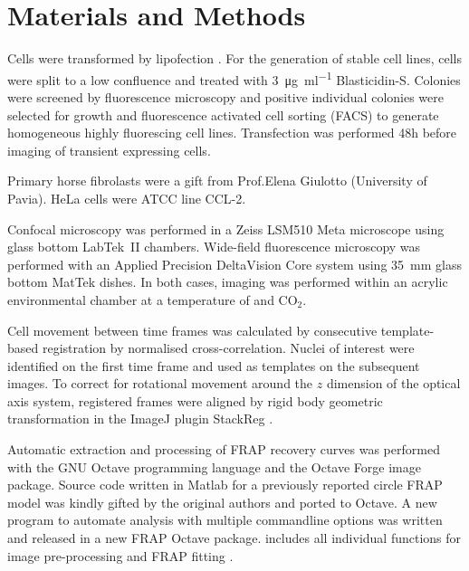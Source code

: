 \section{Materials and Methods}

  Cells were transformed by lipofection .
  For the generation of stable cell lines,
  cells were split to a low confluence and treated
  with \SI{3}{\ug\per\ml} Blasticidin-S.
  Colonies were screened by fluorescence microscopy
  and positive individual colonies were selected for growth
  and fluorescence activated cell sorting (FACS) to generate
  homogeneous highly fluorescing cell lines.
  Transfection was performed 48h before imaging of
  transient expressing cells.

  Primary horse fibrolasts were a gift from Prof.\@ Elena Giulotto
  (University of Pavia). HeLa cells were ATCC line CCL-2.

  Confocal microscopy was performed in a Zeiss LSM510 Meta microscope
  using glass bottom LabTek~II chambers.  Wide-field fluorescence
  microscopy was performed with an Applied Precision DeltaVision Core
  system using \SI{35}{\mm} glass bottom MatTek dishes.  In both
  cases, imaging was performed within an acrylic environmental chamber
  at a temperature of  and  CO$_2$.


  Cell movement between time frames was calculated by consecutive
  template-based registration by normalised cross-correlation.
  Nuclei of interest were identified on the first time frame
  and used as templates on the subsequent images.
  To correct for rotational movement
  around the $z$ dimension of the optical axis system,
  registered frames were aligned by rigid body geometric transformation
  in the ImageJ \citep{imagej1} plugin StackReg \citep{stackreg}.

  Automatic extraction and processing of FRAP recovery curves was
  performed with the GNU Octave programming language \citep{octave}
  and the Octave Forge image package.  Source code written in Matlab
  for a previously reported circle FRAP model \citep{mcnally-frap-code}
  was kindly gifted by the original authors and ported to Octave.
  A new program to automate analysis with multiple commandline options
  was written and released in a new FRAP Octave package.
   includes all individual functions for image
  pre-processing and FRAP fitting .
